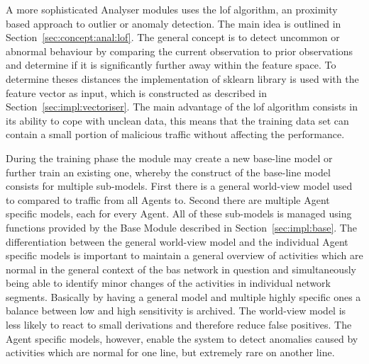 \begin{comment}
	\item using this feature vector 2 models are trained per agent window
		\subitem one agent specific model
		\subitem one world model, which is trained using data from all agents (aka. the whole network)
	\item purpose of the agent model is to be able to detect traffic leakage
		\subitem i.e. traffic that is normal for one line (e.g. light switches and motion sensors) suddenly occurs in the line responsible for \gls{hvac} control
		\subitem agent model is highly trained and most probably highly sensitive, but can detect unusual behaviour which is normal for the network but not for the line
		\subitem world model is more general and not as sensitive, but cannot distinguish between purposes of lines
	\item analyser module stores 1 for being an outlier or 0 for not being an outlier in the \gls{influxdb} per window
		\subitem threshold is decided in analyser
		\subitem easier monitoring, but data get mangled doing this
		\subitem better might be to store the relative distance (output of \gls{lof}) as well
\end{itemize}
\end{comment}

A more sophisticated Analyser modules uses the \gls{lof} algorithm, an proximity based approach to outlier or anomaly detection.
The main idea is outlined in Section~\ref{sec:concept:anal:lof}. The general concept is to detect uncommon or abnormal behaviour by comparing the current observation to prior observations and determine if it is significantly further away within the feature space.
To determine theses distances the  implementation of \gls{sklearn} library is used with the feature vector as input, which is constructed as described in Section~\ref{sec:impl:vectoriser}.
The main advantage of the \gls{lof} algorithm consists in its ability to cope with unclean data, this means that the training data set can contain a small portion of malicious traffic without affecting the performance.

During the training phase the module may create a new base-line model or further train an existing one, whereby the construct of the base-line model consists for multiple sub-models. First there is a general world-view model used to compared to traffic from all Agents to. Second there are multiple Agent specific models, each for every Agent. All of these sub-models is managed using functions provided by the Base Module described in Section~\ref{sec:impl:base}.
The differentiation between the general world-view model and the individual Agent specific models is important to maintain a general overview of activities which are normal in the general context of the \gls{bas} network in question and simultaneously being able to identify minor changes of the activities in individual network segments.
Basically by having a general model and multiple highly specific ones a balance between low and high sensitivity is archived. 
The world-view model is less likely to react to small derivations and therefore reduce false positives. The Agent specific models, however, enable the system to detect anomalies caused by activities which are normal for one line, but extremely rare on another line.


